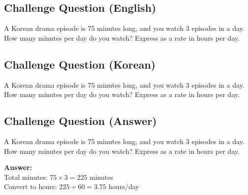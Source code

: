 \cleardoublepage
\subsection*{Challenge Question (English)}
A Korean drama episode is 75 minutes long, and you watch 3 episodes in a day. How many minutes per day do you watch? Express as a rate in hours per day.


\newpage
\subsection*{Challenge Question (Korean)}
A Korean drama episode is 75 minutes long, and you watch 3 episodes in a day. How many minutes per day do you watch? Express as a rate in hours per day.


\newpage
\subsection*{Challenge Question (Answer)}
A Korean drama episode is 75 minutes long, and you watch 3 episodes in a day. How many minutes per day do you watch? Express as a rate in hours per day.

\textbf{Answer:}\\
Total minutes: $75 \times 3 = 225$ minutes\\
Convert to hours: $225 \div 60 = 3.75$ hours/day
